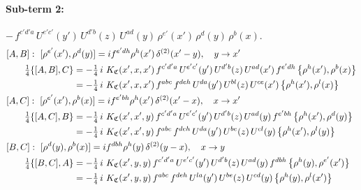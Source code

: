 \documentclass[10pt]{article}
\numberwithin{equation}{section}
\begin{document}
\paragraph{Sub-term 2:} $-\,f^{c'd'a}\,U^{e'c'}(y')\,U^{d'b}(z)\,U^{ad}(y)\,\rho^{e'}(x')\,\rho^{d}(y)\,\rho^{b}(x)$.
\begin{align}
&[A,B]:\ [\rho^{e'}(x'),\rho^{d}(y)]=i f^{e'dh}\rho^{h}(x')\,\delta^{(2)}(x'-y),\quad y\to x'\notag\\
&\qquad \tfrac14\{[A,B],C\}=-\tfrac14\,i\,\,K_{\mathfrak C}(x',x,x')\,f^{c'd'a}\,U^{e'c'}(y')\,U^{d'b}(z)\,U^{ad}(x')\,f^{e'dh}\,\big\{\rho^{h}(x'),\rho^{b}(x)\big\}\notag\\
&\qquad\phantom{\tfrac14\{[A,B],C\}}=-\tfrac14\,i\,\,K_{\mathfrak C}(x',x,x')\,f^{abc}\,f^{deh}\,U^{da}(y')\,U^{bl}(z)\,U^{ce}(x')\,\big\{\rho^{h}(x'),\rho^{l}(x)\big\}
\label{R:eq:GIII.VI-2-AB}\\
&[A,C]:\ [\rho^{e'}(x'),\rho^{b}(x)]=i f^{e'bh}\rho^{h}(x')\,\delta^{(2)}(x'-x),\quad x\to x'\notag\\
&\qquad \tfrac14\{[A,C],B\}=-\tfrac14\,i\,\,K_{\mathfrak C}(x',x',y)\,f^{c'd'a}\,U^{e'c'}(y')\,U^{d'b}(z)\,U^{ad}(y)\,f^{e'bh}\,\big\{\rho^{h}(x'),\rho^{d}(y)\big\}\notag\\
&\qquad\phantom{\tfrac14\{[A,C],B\}}=-\tfrac14\,i\,\,K_{\mathfrak C}(x',x',y)\,f^{abc}\,f^{deh}\,U^{da}(y')\,U^{be}(z)\,U^{cl}(y)\,\big\{\rho^{h}(x'),\rho^{l}(y)\big\}
\label{R:eq:GIII.VI-2-AC}\\
&[B,C]:\ [\rho^{d}(y),\rho^{b}(x)]=i f^{dbh}\rho^{h}(y)\,\delta^{(2)}(y-x),\quad x\to y\notag\\
&\qquad \tfrac14\{[B,C],A\}=-\tfrac14\,i\,\,K_{\mathfrak C}(x',y,y)\,f^{c'd'a}\,U^{e'c'}(y')\,U^{d'b}(z)\,U^{ad}(y)\,f^{dbh}\,\big\{\rho^{h}(y),\rho^{e'}(x')\big\}\notag\\
&\qquad\phantom{\tfrac14\{[B,C],A\}}=-\tfrac14\,i\,\,K_{\mathfrak C}(x',y,y)\,f^{abc}\,f^{deh}\,U^{la}(y')\,U^{be}(z)\,U^{cd}(y)\,\big\{\rho^{h}(y),\rho^{l}(x')\big\}
\label{R:eq:GIII.VI-2-BC}
\end{align}
\end{document}
